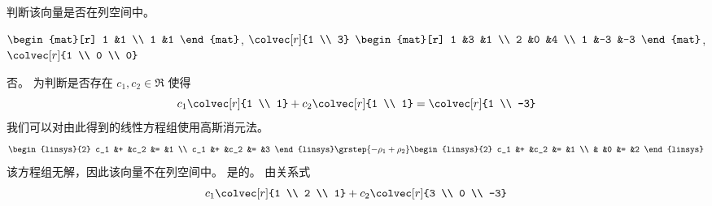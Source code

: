 \begin{exercises}
    判断该向量是否在列空间中。
    \begin{exparts*}
      \partsitem \( \begin{mat}[r]
                 1  &1  \\
                 1  &1
               \end{mat}  \),
            \( \colvec[r]{1 \\ 3} \)
      \partsitem \( \begin{mat}[r]
                 1  &3  &1 \\
                 2  &0  &4 \\
                 1  &-3 &-3
               \end{mat}  \),
            \( \colvec[r]{1 \\ 0 \\ 0} \)
    \end{exparts*}
    \begin{answer}
       \begin{exparts}
          \partsitem 否。
            为判断是否存在 \( c_1,c_2\in\Re \) 使得
            \begin{equation*}
              c_1\colvec[r]{1 \\ 1}
              +c_2\colvec[r]{1 \\ 1}
              =\colvec[r]{1 \\ -3}
            \end{equation*}
            我们可以对由此得到的线性方程组使用高斯消元法。
            \begin{equation*}
              \begin{linsys}{2}
                 c_1  &+  &c_2  &=  &1  \\
                 c_1  &+  &c_2  &=  &3
              \end{linsys}
              \grstep{-\rho_1+\rho_2}
              \begin{linsys}{2}
                 c_1  &+  &c_2  &=  &1  \\
                      &   &0    &=  &2
              \end{linsys}
            \end{equation*}
            该方程组无解，因此该向量不在列空间中。
          \partsitem 是的。
            由关系式
            \begin{equation*}
              c_1\colvec[r]{1 \\ 2 \\ 1}
              +c_2\colvec[r]{3 \\ 0 \\ -3}

\end{equation*}
\end{exparts}
\end{answer}
\end{exercises}
